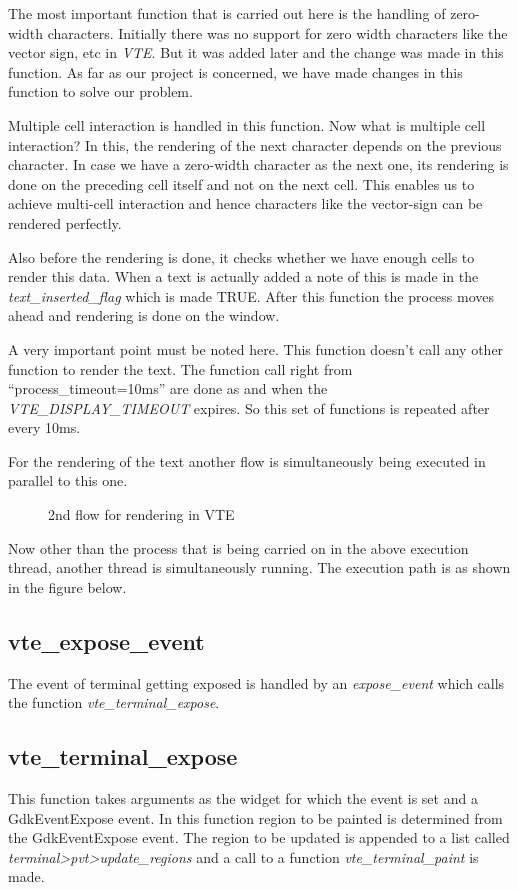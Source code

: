 The most important function that is carried out here is the handling of zero-width characters. Initially there was no support for zero width characters like the vector sign, etc in \textit{VTE}. But it was added later and the change was made in this function. As far as our project is concerned, we have made changes in this function to solve our problem.

Multiple cell interaction is handled in this function. Now what is multiple cell interaction? In this, the rendering of the next character depends on the previous character. In case we have a zero-width character as the next one, its rendering is done on the preceding cell itself and not on the next cell. This enables us to achieve multi-cell interaction and hence characters like the vector-sign can be rendered perfectly.

Also before the rendering is done, it checks whether we have enough cells to render this data. When a text is actually added a note of this is made in the \textit{text\_inserted\_flag} which is made TRUE. After this function the process moves ahead and rendering is done on the window.

A very important point must be noted here. This function doesn't call any other function to render the text. The function call right from ``process\_timeout=10ms'' are done as and when the \textit{VTE\_DISPLAY\_TIMEOUT} expires. So this set of functions is repeated after every 10ms.

For the rendering of the text another flow is simultaneously being executed in parallel to this one.

\begin{figure}[htbp]
\centerline{}
\caption{2nd flow for rendering in VTE} \label{Gnome Terminal8}
\end{figure}

Now other than the process that is being carried on in the above execution thread, another thread is simultaneously running. The execution path is as shown in the figure below.
\pagebreak

\subsection{vte\_expose\_event}
The event of terminal getting exposed is handled by an \textit{expose\_event} which calls the function \textit{vte\_terminal\_expose}.

\subsection{vte\_terminal\_expose}
This function takes arguments as  the widget for which the event is set and a GdkEventExpose event. In this function region to be painted is determined from the GdkEventExpose event. The region to be updated is appended to a list called \textit{terminal\->pvt\->update\_regions} and a call to a function \textit{vte\_terminal\_paint} is made.


